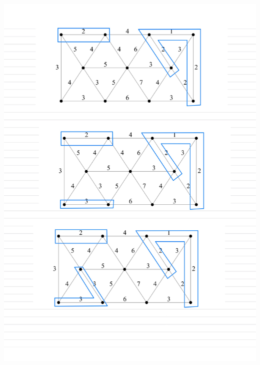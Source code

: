 \documentclass[]{article}
\theoremstyle{definition}
\begin{document}
    \begin{center}
        \includegraphics[width=14cm]{HW1-9.jpg}
    \end{center}
\end{document}
